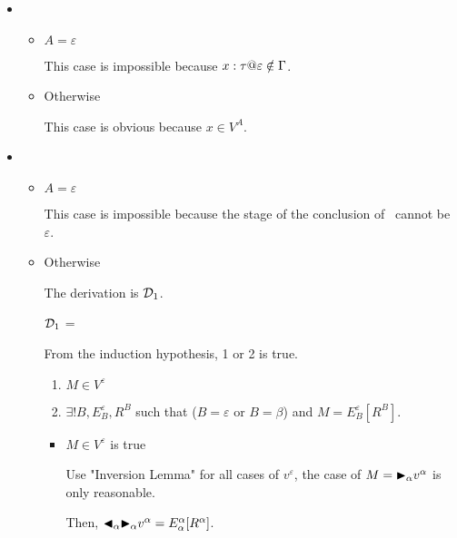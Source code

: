 \begin{itemize}
	\item \TVar
	      \begin{itemize}
	      	\item $ A = \varepsilon$
	      	      	      	      
	      	      This case is impossible because $x:\tau@\varepsilon \notin \G$.
	      	\item Otherwise
	      	      	      	      
	      	      This case is obvious because $x \in V^A$.
	      \end{itemize}
	      	      
	\item \TTBL
	      \begin{itemize}
	      	\item $ A = \varepsilon$
	      	      	      	      
	      	      This case is impossible because the stage of the conclusion of \TTBL\ cannot be $\varepsilon$.
	      	      	      	      
	      	\item Otherwise
	      	      	      	      
	      	      The derivation is $\mathcal{D}_1$.
	      	      	      	      
	      	      $\mathcal{D}_1$ = 
	      	      {}
	      	      	      	      
	      	      From the induction hypothesis, 1 or 2 is true.
	      	      \begin{enumerate}
	      	      	\item $ M \in V^\varepsilon$
	      	      	\item $\exists ! B, E^\varepsilon_B, R^B$ such that ($B = \varepsilon$ or $B = \beta$) and $M = E^\varepsilon_B[R^B]$.
	      	      \end{enumerate}
	      	      	      	      
	      	      \begin{itemize}
	      	      	\item $ M \in V^\varepsilon$ is true
	      	      	      	      	      	      
	      	      	      Use "Inversion Lemma" for all cases of $v^\varepsilon$, the case of $ M = {\mathop{\blacktriangleright}}_\alpha v^\alpha $ is only reasonable.
	      	      	      	      	      	      
	      	      	      Then, ${\mathop{\blacktriangleleft}}_\alpha {\mathop{\blacktriangleright}}_\alpha v^\alpha = E^\alpha_\alpha [R^\alpha]$.
	      	      	      	      	      	      

\end{itemize}
\end{itemize}
\end{itemize}
